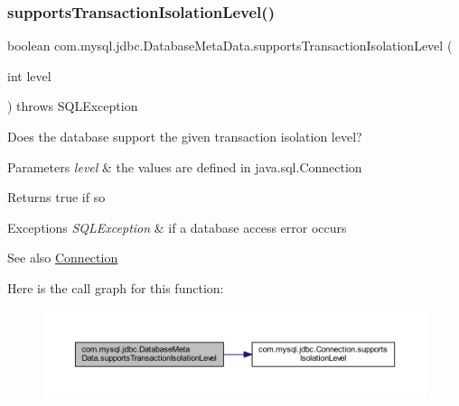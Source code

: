 \subsubsection{\texorpdfstring{supports\+Transaction\+Isolation\+Level()}{supportsTransactionIsolationLevel()}}
{\footnotesize\ttfamily boolean com.\+mysql.\+jdbc.\+Database\+Meta\+Data.\+supports\+Transaction\+Isolation\+Level (\begin{DoxyParamCaption}\item[{int}]{level }\end{DoxyParamCaption}) throws S\+Q\+L\+Exception}

Does the database support the given transaction isolation level?


\begin{DoxyParams}{Parameters}
{\em level} & the values are defined in java.\+sql.\+Connection \\
\hline
\end{DoxyParams}
\begin{DoxyReturn}{Returns}
true if so 
\end{DoxyReturn}

\begin{DoxyExceptions}{Exceptions}
{\em S\+Q\+L\+Exception} & if a database access error occurs \\
\hline
\end{DoxyExceptions}
\begin{DoxySeeAlso}{See also}
\mbox{\hyperlink{interfacecom_1_1mysql_1_1jdbc_1_1_connection}{Connection}} 
\end{DoxySeeAlso}
Here is the call graph for this function\+:
\nopagebreak
\begin{figure}[H]
\begin{center}
\leavevmode
\includegraphics[width=350pt]{classcom_1_1mysql_1_1jdbc_1_1_database_meta_data_abd5412a078a619ef1c47c73317af1d3b_cgraph}
\end{center}
\end{figure}
\mbox{\label{classcom_1_1mysql_1_1jdbc_1_1_database_meta_data_a289cac917f19975c023dc68f8a7ae559}} 
